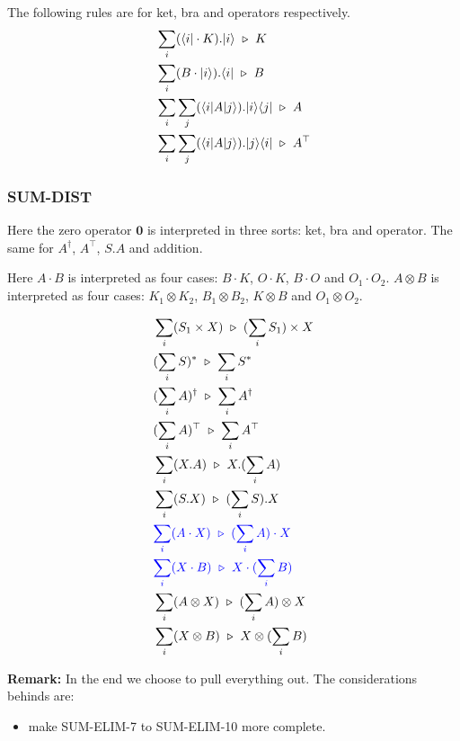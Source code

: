 The following rules are for ket, bra and operators respectively.
\begin{align*}
  & \sum_i (\langle i| \cdot K).|i\rangle \ \triangleright\  K \\
  & \sum_i (B \cdot |i\rangle).\langle i| \ \triangleright\  B \\
  & \sum_i \sum_j (\langle i| A |j\rangle).|i\rangle\langle j| \ \triangleright\  A \\
  & \sum_i \sum_j (\langle i| A |j\rangle).|j\rangle\langle i| \ \triangleright\  A^\top
\end{align*}


\subsubsection*{\textsf{SUM-DIST}}
Here the zero operator $\mathbf{0}$ is interpreted in three sorts: ket, bra and operator. The same for $A^\dagger$, $A^\top$, $S.A$ and addition.

Here $A \cdot B$ is interpreted as four cases: $B \cdot K$, $O \cdot K$, $B \cdot O$ and $O_1 \cdot O_2$. $A \otimes B$ is interpreted as four cases: $K_1 \otimes K_2$, $B_1 \otimes B_2$, $K \otimes B$ and $O_1 \otimes O_2$.

\begin{align*}
  & \sum_i (S_1 \times X) \ \triangleright\  (\sum_i S_1) \times X \\
  & (\sum_i S)^* \ \triangleright\  \sum_i S^* \\
  & (\sum_i A)^\dagger \ \triangleright\  \sum_i A^\dagger \\
  & (\sum_i A)^\top \ \triangleright\  \sum_i A^\top \\
  & \sum_i (X.A) \ \triangleright\  X.(\sum_i A) \\
  & \sum_i (S.X) \ \triangleright\  (\sum_i S). X \\
  & \textcolor{blue}{\sum_i (A \cdot X) \ \triangleright\  (\sum_i A) \cdot X} \\
  & \textcolor{blue}{\sum_i (X \cdot B) \ \triangleright\  X \cdot (\sum_i B)} \\
  & \sum_i (A \otimes X) \ \triangleright\  (\sum_i A) \otimes X \\
  & \sum_i (X \otimes B) \ \triangleright\  X \otimes (\sum_i B)
\end{align*}

\textbf{Remark:} In the end we choose to pull everything out. The considerations behinds are:
\begin{itemize}
  \item make \textsf{SUM-ELIM-7} to \textsf{SUM-ELIM-10} more complete.
\end{itemize}



